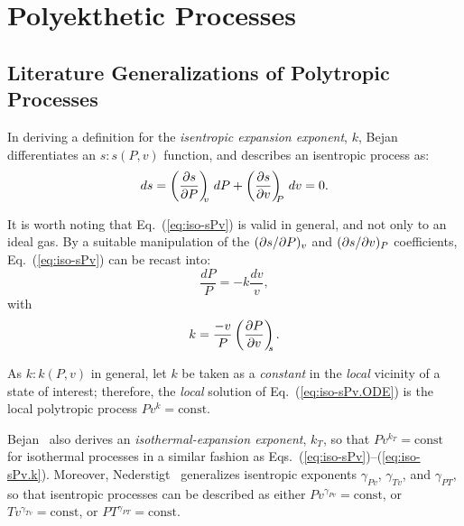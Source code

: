 \section{Polyekthetic Processes}

    \subsection{Literature Generalizations of Polytropic Processes}

    In  deriving   a   definition   for   the   \emph{isentropic   expansion   exponent},   $k$,
    Bejan~\cite{2006-BejanA-Wiley} differentiates an $s:s(P,  v)$  function,  and  describes  an
    isentropic process as:
    \begin{equation}
        ds = \left(\frac{\partial {{s}}}{\partial {{P}}}\right)_{\!\!\!{v}}\,dP + \left(\frac{\partial {{s}}}{\partial {{v}}}\right)_{\!\!\!{P}}\,dv = 0.
        \label{eq:iso-sPv}
    \end{equation}

    It is worth noting that Eq.~(\ref{eq:iso-sPv}) is valid in general, and not only to an ideal
    gas. By a suitable manipulation  of  the  $({\partial {{s}}}/{\partial {{P}}})_{{v}}$  and  $({\partial {{s}}}/{\partial {{v}}})_{{P}}$  coefficients,
    Eq.~(\ref{eq:iso-sPv}) can be recast into:
    \begin{equation}
        \frac{dP}{P} = -k\frac{dv}{v},
        \label{eq:iso-sPv.ODE}
    \end{equation}
    \noindent with
    \begin{equation}
        k = \frac{-v}{P}\left(\frac{\partial {{P}}}{\partial {{v}}}\right)_{\!\!\!{s}}.
        \label{eq:iso-sPv.k}
    \end{equation}

    As $k:k(P, v)$ in general, let $k$  be  taken  as  a  \emph{constant}  in  the  \emph{local}
    vicinity   of   a   state   of   interest;   therefore,   the   \emph{local}   solution   of
    Eq.~(\ref{eq:iso-sPv.ODE}) is the local polytropic process $Pv^k = \mbox{const}$.

    Bejan~\cite{2006-BejanA-Wiley} also derives an \emph{isothermal-expansion exponent},  $k_T$,
    so that $Pv^{k_T}  =  \mbox{const}$  for  isothermal  processes  in  a  similar  fashion  as
    Eqs.~(\ref{eq:iso-sPv})--(\ref{eq:iso-sPv.k}).                                     Moreover,
    Nederstigt~\cite{2017-NederstigtP-TUDelft} generalizes isentropic  exponents  $\gamma_{Pv}$,
    $\gamma_{Tv}$, and $\gamma_{PT}$, so that isentropic processes can be  described  as  either
    $Pv^{\gamma_{Pv}}   =   \mbox{const}$,   or   $Tv^{\gamma_{Tv}}    =    \mbox{const}$,    or
    $PT^{\gamma_{PT}} = \mbox{const}$.


